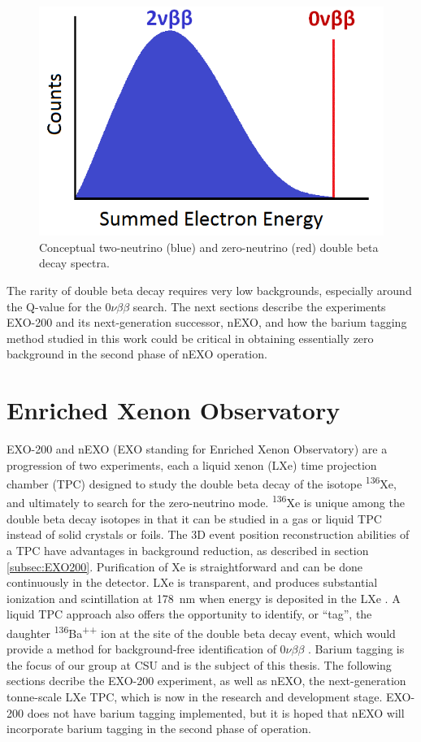 \begin{figure} %
        \centering
                \includegraphics[width=.5\textwidth]{figures/spectrum_bb.png}
                \caption{Conceptual two-neutrino (blue) and zero-neutrino (red) double beta decay spectra.}
\label{fig:spectrum_bb}
\end{figure}


The rarity of double beta decay requires very low backgrounds, especially around the Q-value for the $0\nu\beta\beta$ search. The next sections describe the experiments EXO-200 and its next-generation successor, nEXO, and how the barium tagging method studied in this work could be critical in obtaining essentially zero background in the second phase of nEXO operation.

\section{Enriched Xenon Observatory}

EXO-200 and nEXO (EXO standing for Enriched Xenon Observatory) are a progression of two experiments, each a liquid xenon (LXe) time projection chamber (TPC) designed to study the double beta decay of the isotope \textsuperscript{136}Xe, and ultimately to search for the zero-neutrino mode.  \textsuperscript{136}Xe is unique among the double beta decay isotopes in that it can be studied in a gas or liquid TPC instead of solid crystals or foils.  The 3D event position reconstruction abilities of a TPC have advantages in background reduction, as described in section \ref{subsec:EXO200}.  Purification of Xe is straightforward and can be done continuously in the detector.  LXe is transparent, and produces substantial ionization and scintillation at 178~nm when energy is deposited in the LXe \cite{EXO200TwoNuLong}.  A liquid TPC approach also offers the opportunity to identify, or ``tag'', the daughter \textsuperscript{136}Ba\textsuperscript{++} ion at the site of the double beta decay event, which would provide a method for background-free identification of $0\nu\beta\beta$ \cite{Moe1991}. Barium tagging is the focus of our group at CSU and is the subject of this thesis.  The following sections decribe the EXO-200 experiment, as well as nEXO, the next-generation tonne-scale LXe TPC, which is now in the research and development stage.  EXO-200 does not have barium tagging implemented, but it is hoped that nEXO will incorporate barium tagging in the second phase of operation. 

